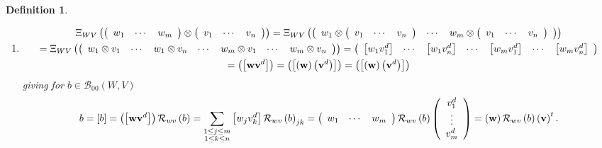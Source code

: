 \documentclass[aps,preprint]{revtex4}%
\newtheorem{definition}[theorem]{Definition}
\begin{document}
\begin{definition}
\begin{enumerate}
\item
\begin{gather}
\Xi_{WV}\left(  \left(
\begin{array}
[c]{ccc}%
w_{1} & \cdots & w_{m}%
\end{array}
\right)  \otimes\left(
\begin{array}
[c]{ccc}%
v_{1} & \cdots & v_{n}%
\end{array}
\right)  \right)  =\Xi_{WV}\left(  \left(
\begin{array}
[c]{ccc}%
w_{1}\otimes\left(
\begin{array}
[c]{ccc}%
v_{1} & \cdots & v_{n}%
\end{array}
\right)  & \cdots & w_{m}\otimes\left(
\begin{array}
[c]{ccc}%
v_{1} & \cdots & v_{n}%
\end{array}
\right)
\end{array}
\right)  \right) \\
=\Xi_{WV}\left(  \left(
\begin{array}
[c]{ccccccc}%
w_{1}\otimes v_{1} & \cdots & w_{1}\otimes v_{n} & \cdots & w_{m}\otimes v_{1}
& \cdots & w_{m}\otimes v_{n}%
\end{array}
\right)  \right)  =\left(
\begin{array}
[c]{ccccccc}%
\left[  w_{1}v_{1}^{d}\right]  & \cdots & \left[  w_{1}v_{n}^{d}\right]  &
\cdots & \left[  w_{m}v_{1}^{d}\right]  & \cdots & \left[  w_{m}v_{n}%
^{d}\right]
\end{array}
\right) \\
=\left(  \left[  \mathbf{wv}^{d}\right]  \right)  =\left(  \left[  \left(
\mathbf{w}\right)  \left(  \mathbf{v}^{d}\right)  \right]  \right)  =\left(
\left[  \left(  \mathbf{w}\right)  \left(  \mathbf{v}^{d}\right)  \right]
\right)
\end{gather}
giving for $b\in\mathcal{B}_{00}\left(  W,V\right)  $%
\begin{equation}
b=\left[  b\right]  =\left(  \left[  \mathbf{wv}^{d}\right]  \right)
\mathcal{R}_{wv}\left(  b\right)  =\sum_{\substack{1\leq j\leq m\\1\leq k\leq
n}}\left[  w_{j}v_{k}^{d}\right]  \mathcal{R}_{wv}\left(  b\right)
_{jk}=\left(
\begin{array}
[c]{ccc}%
w_{1} & \cdots & w_{m}%
\end{array}
\right)  \mathcal{R}_{wv}\left(  b\right)  \left(
\begin{array}
[c]{c}%
v_{1}^{d}\\
\vdots\\
v_{m}^{d}%
\end{array}
\right)  =\left(  \mathbf{w}\right)  \mathcal{R}_{wv}\left(  b\right)  \left(
\mathbf{v}\right)  ^{t}.
\end{equation}



\end{enumerate}
\end{definition}
\end{document}

